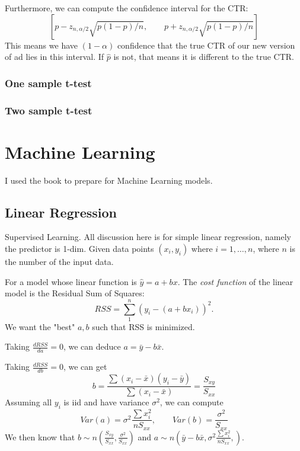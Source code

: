 \documentclass[12pt]{amsart}
\numberwithin{equation}{section}
\theoremstyle{plain}
\theoremstyle{definition}
\begin{document}
Furthermore, we can compute the confidence interval for the CTR:
$$
[p-z_{n,\alpha/2}\sqrt{p(1-p)/n}, \qquad p+z_{n,\alpha/2}\sqrt{p(1-p)/n}]
$$
This means we have $(1-\alpha)$ confidence that the true CTR of our new version of ad lies in this interval. If $\hat p$ is not, that means it is different to the true CTR.

\subsubsection{One sample t-test}

\subsubsection{Two sample t-test}

\section{Machine Learning}

I used the book \cite{ISLR} to prepare for Machine Learning models.

\subsection{Linear Regression}

Supervised Learning. All discussion here is for simple linear regression, namely the predictor is 1-dim. Given data points $(x_i, y_i)$ where $i = 1,\ldots, n$, where $n$ is the number of the input data.

For a model whose linear function is $\hat y = a+bx$. The {\em cost function} of the linear model is the Residual Sum of Squares: $$RSS = \sum_1^n(y_i-(a+bx_i))^2.$$
We want the "best" $a, b$ such that RSS is minimized.

Taking $\frac{dRSS}{da}=0$, we can deduce $a=\bar{y}-b\bar{x}$.

Taking $\frac{dRSS}{db}=0$, we can get 
$$
b=\frac{\sum(x_i-\bar{x})(y_i-\bar{y})}{\sum(x_i-\bar{x})}=\frac{S_{xy}}{S_{xx}}
$$
Assuming all $y_i$ is iid and have variance $\sigma^2$, we can compute
$$
Var(a) = \sigma^2\frac{\sum x_i^2}{nS_{xx}}, \qquad Var(b)=\frac{\sigma^2}{S_{xx}}
$$
We then know that $b\sim n(\frac{S_{xy}}{S_{xx}},\frac{\sigma^2}{S_{xx}})$ and $a\sim n(\bar{y}-b\bar{x},\sigma^2\frac{\sum x_i^2}{nS_{xx}},)$.
\end{document}
